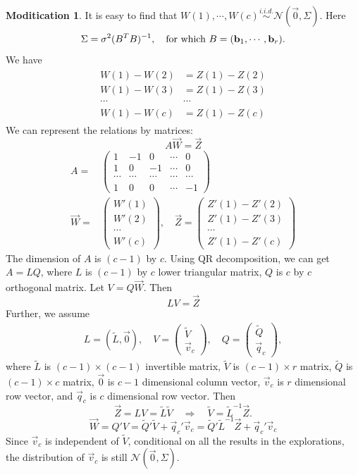 \documentclass{article}
\theoremstyle{plain}
\theoremstyle{definition}
\newtheorem{modification}{Moditication}
\begin{document}
\begin{modification}
It is easy to find that $W(1),\cdots, W(c)\stackrel{i.i.d.}{\sim}\mathcal{N}(\vec{0},\Sigma)$. Here 
\[\Sigma=\sigma^2(B^TB)^{-1},\quad \text{for which }B=(\bold{b}_1,\cdots,\bold{b}_r).\]
We have
\begin{align*}
\begin{array}{ll}
W(1)-W(2)&=Z(1)-Z(2)\\
W(1)-W(3)&=Z(1)-Z(3)\\
\cdots &\cdots\\
W(1)-W(c)&=Z(1)-Z(c)
\end{array}
\end{align*}
We can represent the relations by matrices:
\[A\vec{W}=\vec{Z}\]
\begin{align*}
A=&\left(
\begin{array}{ccccc}
1&-1&0&\cdots&0\\
1&0&-1&\cdots&0\\
\cdots&\cdots&\cdots&\cdots&\cdots\\
1&0&0&\cdots&-1
\end{array}\right)\\
\vec{W}=&\left(\begin{array}{c}W'(1)\\W'(2)\\ \cdots \\ W'(c)\end{array}\right),\quad \vec{Z}=\left(\begin{array}{c}
Z'(1)-Z'(2)\\
Z'(1)-Z'(3)\\
\cdots\\
Z'(1)-Z'(c)
\end{array}\right)
\end{align*}
The dimension of $A$ is $(c-1)$ by $c$. Using QR decomposition, we can get $A=LQ$, where $L$ is $(c-1)$ by $c$ lower triangular matrix, $Q$ is $c$ by $c$ orthogonal matrix. Let ${V}=Q\vec{W}$. Then 
\[L{V}=\vec{Z}\]
Further, we assume
\begin{align*}
L=(\tilde{L},\vec{0}),\quad {V}=\left(\begin{array}{c}\tilde{V}\\\vec{v}_c\end{array}\right),\quad Q=\left(\begin{array}{c}\tilde{Q}\\\vec{q}_c\end{array}\right),
\end{align*}
where $\tilde{L}$ is $(c-1)\times (c-1)$ invertible matrix, $\tilde{V}$ is $(c-1)\times r$ matrix, $\tilde{Q}$ is $(c-1)\times c$ matrix, $\vec{0}$ is $c-1$ dimensional column vector, $\vec{v}_c$ is $r$ dimensional row vector, and $\vec{q}_c$ is $c$ dimensional row vector. Then
\[\vec{Z}=LV = \tilde{L}\tilde{V} \quad \Rightarrow \quad \tilde{V}=\tilde{L}^{-1}\vec{Z}.\]
\[\vec{W}=Q'V=\tilde{Q}'\tilde{V}+\vec{q}_c'\vec{v}_c=\tilde{Q}'\tilde{L}^{-1}\vec{Z}+\vec{q}_c'\vec{v}_c\]
Since $\vec{v}_c$ is independent of $\tilde{V}$, conditional on all the results in the explorations, the distribution of $\vec{v}_c$ is still $\mathcal{N}(\vec{0},\Sigma)$.


\end{modification}
\end{document}
